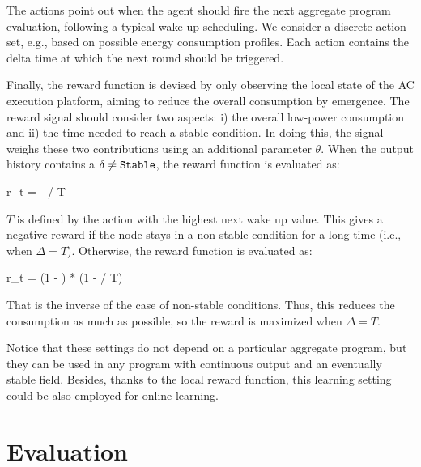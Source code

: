The actions point out when the agent should fire the next aggregate program evaluation, following a typical wake-up scheduling.
%
We consider a discrete action set, e.g., based on possible energy consumption profiles.
% 
Each action contains the delta time at which the next round should be triggered. 

Finally, the reward function is devised by only observing the local state of the \ac{AC} execution platform, aiming to reduce the overall consumption by emergence.
%
The reward signal should consider two aspects: i) the overall low-power consumption and ii) the time needed to reach a stable condition.  
In doing this, the signal weighs these two contributions using an additional parameter $\theta$.
 When the output history contains a $\delta \neq \text{\texttt{Stable}}$, the reward function is evaluated as:
\begin{iequation}
r_t = - \theta * \Delta / T
\end{iequation}
$T$ is defined by the action with the highest next wake up value.
%
This gives a negative reward if the node stays in a non-stable condition for a long time (i.e., when $\Delta = T$).
Otherwise, the reward function is evaluated as:
\begin{iequation}
r_t = (1 - \theta) * (1 - \Delta / T)
\end{iequation}
That is the inverse of the case of non-stable conditions. 
 Thus, this reduces the consumption as much as possible, so the reward is maximized when $\Delta = T$. 

Notice that these settings do not depend on a particular aggregate program, 
 but they can be used in any program with continuous output and an eventually stable field. 
%
Besides, thanks to the local reward function, this learning setting could be also employed for online learning.

\newcommand{\rlsol}{{\sc{}Rl}}
\newcommand{\periodicsol}{{\sc{}Periodic}}
\newcommand{\adhocsol}{{\sc{}Ad-hoc}}
\newcommand{\swapscen}{{\sc{}Swap}}
\newcommand{\multiswap}{{\sc{}MultiSwap}}
\section{Evaluation}\label{acsos2022:sec:evaluation}



